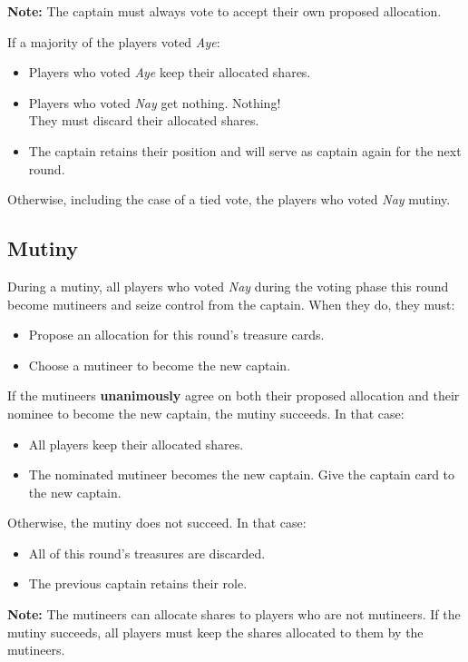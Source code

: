 \textbf{Note:} The captain must always vote to accept their own proposed allocation.

If a majority of the players voted \textit{Aye}:
\begin{itemize}[leftmargin=*]
\item Players who voted \textit{Aye} keep their allocated shares.
\item Players who voted \textit{Nay} get nothing. Nothing!\\They must discard their allocated shares.
\item The captain retains their position and will serve as captain again for the next round.
\end{itemize}

Otherwise, including the case of a tied vote, the players who voted \textit{Nay} mutiny.

\newpage

\subsection*{Mutiny}
During a mutiny, all players who voted \textit{Nay} during the voting phase this round become mutineers and seize control from the captain.
When they do, they must:
\begin{itemize}[leftmargin=*]
\item Propose an allocation for this round's treasure cards.
\item Choose a mutineer to become the new captain.
\end{itemize}

If the mutineers \textbf{unanimously} agree on both their proposed allocation and their nominee to become the new captain, the mutiny succeeds.
In that case:
\begin{itemize}[leftmargin=*]
\item All players keep their allocated shares.
\item The nominated mutineer becomes the new captain. Give the captain card to the new captain.
\end{itemize}

Otherwise, the mutiny does not succeed. In that case:
\begin{itemize}[leftmargin=*]
\item All of this round's treasures are discarded.
\item The previous captain retains their role.
\end{itemize}

\textbf{Note:} The mutineers can allocate shares to players who are not mutineers. If the mutiny succeeds, all players must keep the shares allocated to them by the mutineers.
